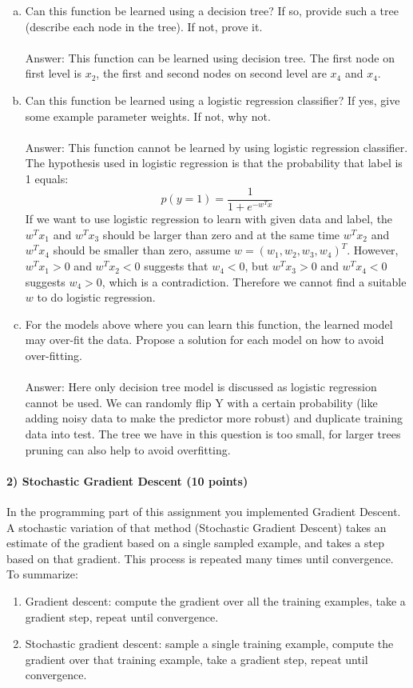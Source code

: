 \documentclass[11pt]{article}
\begin{document}
\begin{enumerate}[(a)]
\item Can this function be learned using a decision tree? If so, provide such a tree (describe each node in the tree). If not, prove it.\\\\
Answer: This function can be learned using decision tree. The first node on first level is $x_2$, the first and second nodes on second level are $x_4$ and $x_4$.

\item Can this function be learned using a logistic regression classifier? If yes, give some example parameter weights. If not, why not.\\\\
Answer: This function cannot be learned by using logistic regression classifier. The hypothesis used in logistic regression is that the probability that label is 1 equals:
$$p(y=1)=\frac{1}{1+e^{-w^Tx}}$$
If we want to use logistic regression to learn with given data and label, the $w^Tx_1$ and $w^Tx_3$ should be larger than zero and at the same time $w^Tx_2$ and $w^Tx_4$ should be smaller than zero, assume $w = (w_1, w_2, w_3, w_4)^T$. However, $w^Tx_1 > 0$ and $w^Tx_2 < 0$ suggests that $w_4 < 0$, but  $w^Tx_3 > 0$ and $w^Tx_4 < 0$ suggests $w_4 > 0$, which is a contradiction. Therefore we cannot find a suitable $w$ to do logistic regression.

\item For the models above where you can learn this function, the learned model may over-fit the data. Propose a solution for each model on how to avoid over-fitting.\\\\
Answer: Here only decision tree model is discussed as logistic regression cannot be used. We can randomly flip Y with a certain probability (like adding noisy data to make the predictor more robust) and duplicate training data into test. The tree we have in this question is too small, for larger trees pruning can also help to avoid overfitting. \end{enumerate}

\paragraph{2) Stochastic Gradient Descent (10 points)}
In the programming part of this assignment you implemented Gradient Descent. A stochastic variation of that method (Stochastic Gradient Descent) takes an estimate of the gradient based on a single sampled example, and takes a step based on that gradient. This process is repeated many times until convergence. To summarize:
\begin{enumerate}
\item Gradient descent: compute the gradient over all the training examples, take a gradient step, repeat until convergence.
\item Stochastic gradient descent: sample a single training example, compute the gradient over that training example, take a gradient step, repeat until convergence.
\end{enumerate}
\end{document}

